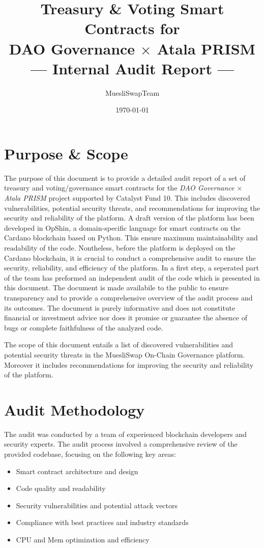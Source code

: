 \documentclass[11pt]{article}
\title{Treasury \& Voting Smart Contracts for\\DAO Governance $\times$ Atala PRISM\\[12pt]--- Internal Audit Report ---}
\author{MuesliSwapTeam}
\date{\today}
\begin{document}
\maketitle

\section{Purpose \& Scope}
The purpose of this document is to provide a detailed audit report of a set of treasury and voting/governance smart contracts for the \emph{DAO Governance $\times$ Atala PRISM} project supported by Catalyst Fund 10. This includes discovered vulnerabilities, potential security threats, and recommendations for improving the security and reliability of the platform. A draft version of the platform has been developed in OpShin, a domain-specific language for smart contracts on the Cardano blockchain based on Python.
This ensure maximum maintainability and readability of the code.
Nontheless, before the platform is deployed on the Cardano blockchain, it is crucial to conduct a comprehensive audit to ensure the security, reliability, and efficiency of the platform.
In a first step, a seperated part of the team has preformed an independent audit of the code which is presented in this document.
The document is made availabile to the public to ensure transparency and to provide a comprehensive overview of the audit process and its outcomes.
The document is purely informative and does not constitute financial or investment advice nor does it promise or guarantee the absence of bugs
or complete faithfulness of the analyzed code.

The scope of this document entails a list of discovered vulnerabilities and potential security threats in the MuesliSwap On-Chain Governance platform.
Moreover it includes recommendations for improving the security and reliability of the platform.

\section{Audit Methodology}
The audit was conducted by a team of experienced blockchain developers and security experts.
The audit process involved a comprehensive review of the provided codebase, focusing on the following key areas:

\begin{itemize}
    \item Smart contract architecture and design
    \item Code quality and readability
    \item Security vulnerabilities and potential attack vectors
    \item Compliance with best practices and industry standards
    \item CPU and Mem optimization and efficiency
\end{itemize}
\end{document}
